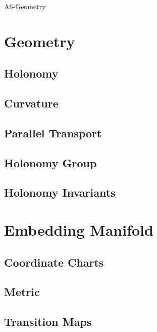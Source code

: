 \documentclass[11pt]{article}
\begin{document}
\begin{citationmembrane}{A6-Geometry}
\end{citationmembrane}

\section{Geometry}

\subsection{Holonomy}
\subsection{Curvature}
\subsection{Parallel Transport}
\subsection{Holonomy Group}
\subsection{Holonomy Invariants}

\newpage



\section{Embedding Manifold}

\subsection{Coordinate Charts}
\subsection{Metric}
\subsection{Transition Maps}
\end{document}
